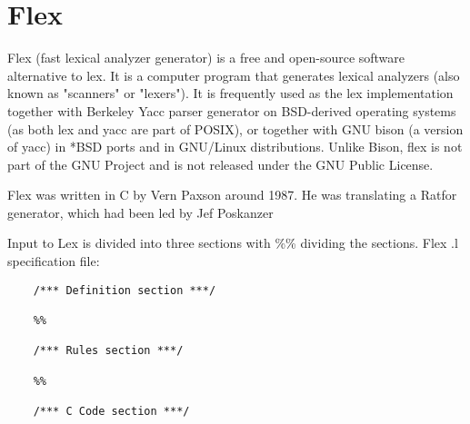 \section{Flex}

Flex (fast lexical analyzer generator) is a free and open-source software alternative to lex. It is a computer program that generates lexical analyzers (also known as "scanners" or "lexers"). It is frequently used as the lex implementation together with Berkeley Yacc parser generator on BSD-derived operating systems (as both lex and yacc are part of POSIX), or together with GNU bison (a version of yacc) in *BSD ports and in GNU/Linux distributions. Unlike Bison, flex is not part of the GNU Project and is not released under the GNU Public License.

Flex was written in C by Vern Paxson around 1987. He was translating a Ratfor generator, which had been led by Jef Poskanzer

Input to Lex is divided into three sections with \%\% dividing the sections. Flex .l specification file:
\begin{verbatim}
	/*** Definition section ***/
	
	%%
	
	/*** Rules section ***/
	
	%%
	
	/*** C Code section ***/
\end{verbatim}
